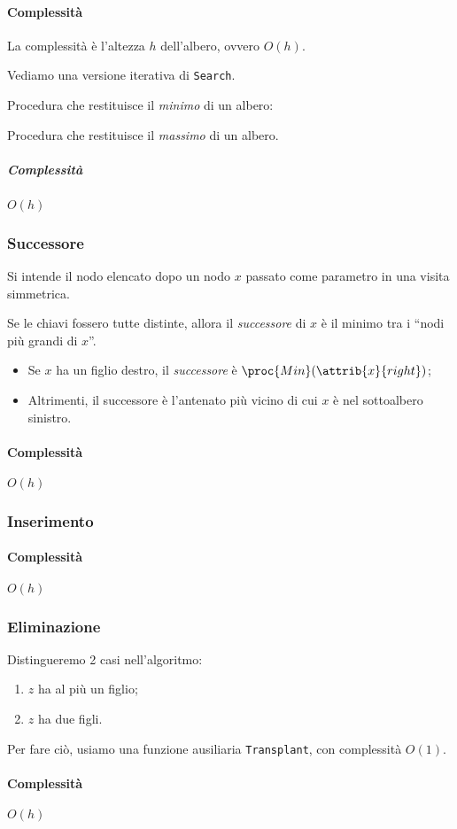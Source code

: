 

\paragraph{Complessità} La complessità è l'altezza $h$ dell'albero, ovvero $O(h)$.

\bigskip
Vediamo una versione iterativa di \texttt{Search}.


Procedura che restituisce il \emph{minimo} di un albero:


Procedura che restituisce il \emph{massimo} di un albero.


\subparagraph{Complessità} $O(h)$

\subsubsection{Successore}
Si intende il nodo elencato dopo un nodo $x$ passato come parametro in una visita simmetrica.

Se le chiavi fossero tutte distinte, allora il \emph{successore} di $x$ 
è il minimo tra i ``nodi più grandi di $x$''.
\begin{itemize}
	\item Se $x$ ha un figlio destro, il \emph{successore} è $\proc{Min}(\attrib{x}{right})$;
	\item Altrimenti, il successore è l'antenato più vicino di cui $x$ è nel 
	sottoalbero sinistro.
\end{itemize}


\paragraph{Complessità} $O(h)$


\subsubsection{Inserimento}



\paragraph{Complessità} $O(h)$

\subsubsection{Eliminazione}
Distingueremo 2 casi nell'algoritmo:
\begin{enumerate}[label=($\arabic*$)]
	\item $z$ ha al più un figlio;
	\item $z$ ha due figli.
\end{enumerate}
Per fare ciò, usiamo una funzione ausiliaria \texttt{Transplant}, con 
complessità $O(1)$.

 


\paragraph{Complessità} $O(h)$